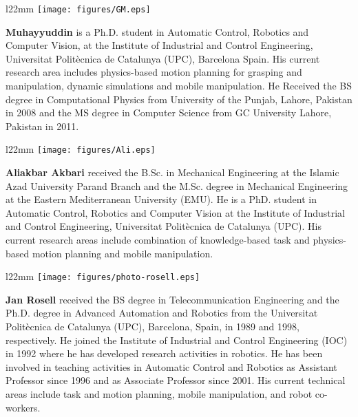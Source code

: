 \documentclass[twocolumn]{svjour3}          %
\begin{document}
 \begin{wrapfigure}{l}{22mm} 
 \vspace{-7mm}
    \texttt{[image: figures/GM.eps]}
  \end{wrapfigure}\par
  \textbf{Muhayyuddin}  is a Ph.D. student in Automatic Control, Robotics and Computer Vision, at the Institute of Industrial and Control Engineering, Universitat Polit\`ecnica de Catalunya
(UPC), Barcelona Spain. His current research area includes physics-based motion planning for grasping and manipulation, dynamic simulations and mobile manipulation. He Received the BS degree in 
Computational Physics from University of the Punjab, Lahore, Pakistan in 2008 and the MS degree in Computer Science from GC University Lahore, Pakistan in 2011.
 \vspace{5mm}

 \begin{wrapfigure}{l}{22mm} 
 \vspace{-7mm}
    \texttt{[image: figures/Ali.eps]}
  \end{wrapfigure}\par
  \textbf{ Aliakbar Akbari} received the B.Sc. in Mechanical Engineering at the Islamic Azad University Parand Branch and the M.Sc. degree in Mechanical Engineering at the Eastern 
Mediterranean University (EMU). He is a PhD.  student in Automatic Control, Robotics and Computer Vision at the Institute of Industrial and Control Engineering, Universitat Polit\`ecnica de Catalunya 
(UPC). His current research areas include combination of knowledge-based task and physics-based motion planning and mobile manipulation.
 \vspace{5mm}

\begin{wrapfigure}{l}{22mm} 
 \vspace{-7mm}
    \texttt{[image: figures/photo-rosell.eps]}
  \end{wrapfigure}\par
  \textbf{ Jan Rosell}  received the BS degree in Telecommunication Engineering and the Ph.D. degree in Advanced Automation and Robotics from the Universitat Polit\`ecnica de Catalunya (UPC), 
Barcelona, Spain, in 1989 and 1998, respectively. He joined the Institute of Industrial and Control Engineering (IOC) in 1992 where he has developed research activities in robotics. He has been 
involved in teaching activities in Automatic Control and Robotics as Assistant Professor since 1996 and as Associate Professor since 2001. His current technical areas include task and motion planning, 
mobile manipulation, and robot co-workers.




\end{document}
